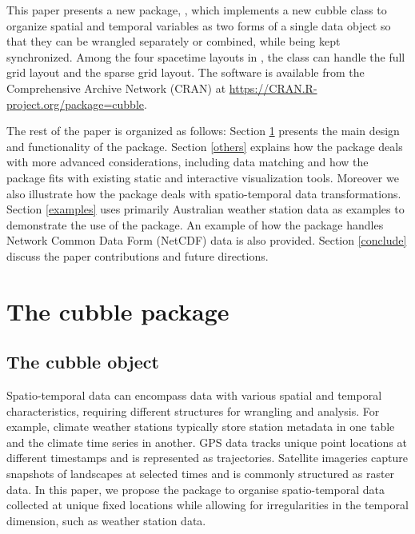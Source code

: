 \documentclass[
  shortnames]{jss}
\begin{document}
This paper presents a new  package, , which implements a new cubble class to organize spatial and temporal variables as two forms of a single data object so that they can be wrangled separately or combined, while being kept synchronized. Among the four spacetime layouts in \citet{spacetime}, the  class can handle the full grid layout and the sparse grid layout. The software is available from the Comprehensive  Archive Network (CRAN) at \url{https://CRAN.R-project.org/package=cubble}.

The rest of the paper is organized as follows: Section \ref{cubble} presents the main design and functionality of the  package. Section \ref{others} explains how the  package deals with more advanced considerations, including data matching and how the package fits with existing static and interactive visualization tools. Moreover we also illustrate how the  package deals with spatio-temporal data transformations. Section \ref{examples} uses primarily Australian weather station data as examples to demonstrate the use of the package. An example of how the  package handles Network Common Data Form (NetCDF) data is also provided. Section \ref{conclude} discuss the paper contributions and future directions.

\hypertarget{cubble}{%
\section{The cubble package}\label{cubble}}

\hypertarget{object}{%
\subsection{The cubble object}\label{object}}

Spatio-temporal data can encompass data with various spatial and temporal characteristics, requiring different structures for wrangling and analysis. For example, climate weather stations typically store station metadata in one table and the climate time series in another. GPS data tracks unique point locations at different timestamps and is represented as trajectories. Satellite imageries capture snapshots of landscapes at selected times and is commonly structured as raster data. In this paper, we propose the  package to organise spatio-temporal data collected at unique fixed locations while allowing for irregularities in the temporal dimension, such as weather station data.
\end{document}
